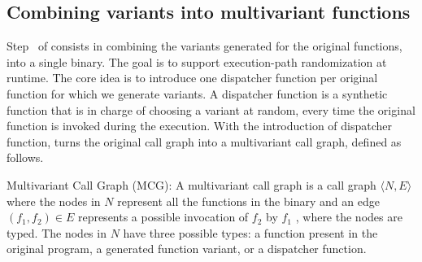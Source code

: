 \subsection*{Combining variants into multivariant functions}

Step~ of \tool consists in combining the variants generated for the original functions, into a single binary.
The goal is to support execution-path randomization at runtime.
The core idea is to introduce one dispatcher function per original function for which we generate variants.
A dispatcher function is a synthetic function that is in charge of choosing a variant at random, every time the original function is invoked during the execution.
With the introduction of dispatcher function,  \tool turns the original call graph into a multivariant call graph, defined as follows. 

\begin{definition}{Multivariant Call Graph (MCG):}\label{def:EP}
    A multivariant call graph is a call graph $\langle N,E \rangle$ where the nodes in $N$ represent all the functions in the binary and an edge $(f_1,f_2) \in E$ represents a possible invocation of $f_2$ by $f_1$  \cite{ryder1979}, where the nodes are typed. The nodes in $N$ have three possible types: a function present in the original program,  a generated function variant, or a dispatcher function.
\end{definition}


